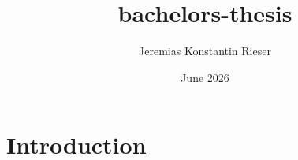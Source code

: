 \documentclass{article}
\title{bachelors-thesis}
\author{Jeremias Konstantin Rieser }
\date{June 2026}
\begin{document}
\maketitle

\section{Introduction}
\end{document}
